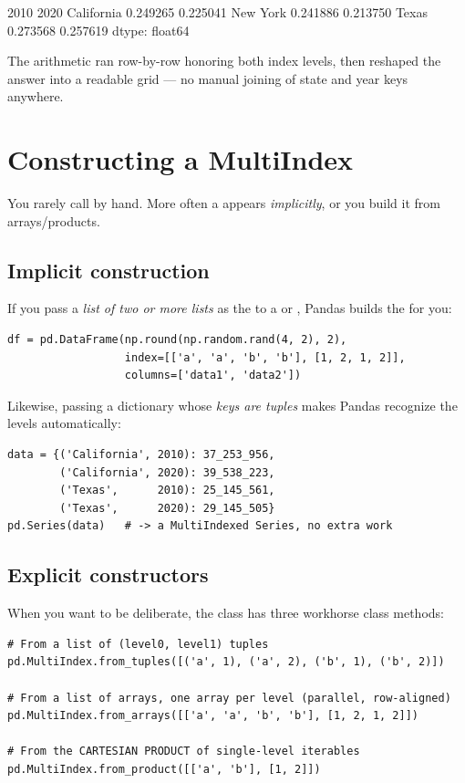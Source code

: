 \documentclass[11pt]{article}
\begin{document}
\begin{outblock}
                2010      2020
California   0.249265  0.225041
New York     0.241886  0.213750
Texas        0.273568  0.257619
dtype: float64
\end{outblock}

The arithmetic ran row-by-row honoring both index levels, then  reshaped the answer into a readable grid --- no manual joining of state and year keys anywhere.

\section{Constructing a MultiIndex}

You rarely call  by hand. More often a  appears \emph{implicitly}, or you build it from arrays/products.

\subsection{Implicit construction}

If you pass a \emph{list of two or more lists} as the  to a  or , Pandas builds the  for you:

\begin{lstlisting}
df = pd.DataFrame(np.round(np.random.rand(4, 2), 2),
                  index=[['a', 'a', 'b', 'b'], [1, 2, 1, 2]],
                  columns=['data1', 'data2'])
\end{lstlisting}

Likewise, passing a dictionary whose \emph{keys are tuples} makes Pandas recognize the levels automatically:

\begin{lstlisting}
data = {('California', 2010): 37_253_956,
        ('California', 2020): 39_538_223,
        ('Texas',      2010): 25_145_561,
        ('Texas',      2020): 29_145_505}
pd.Series(data)   # -> a MultiIndexed Series, no extra work
\end{lstlisting}

\subsection{Explicit constructors}

When you want to be deliberate, the  class has three workhorse class methods:

\begin{lstlisting}
# From a list of (level0, level1) tuples
pd.MultiIndex.from_tuples([('a', 1), ('a', 2), ('b', 1), ('b', 2)])

# From a list of arrays, one array per level (parallel, row-aligned)
pd.MultiIndex.from_arrays([['a', 'a', 'b', 'b'], [1, 2, 1, 2]])

# From the CARTESIAN PRODUCT of single-level iterables
pd.MultiIndex.from_product([['a', 'b'], [1, 2]])
\end{lstlisting}
\end{document}
